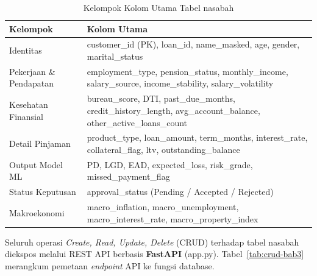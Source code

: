 \begin{table}[H]
\centering
\caption{Kelompok Kolom Utama Tabel nasabah}
\label{tab:db-cols}
\begin{tabularx}{\textwidth}{|p{3.5cm}|X|}
\hline
\textbf{Kelompok} & \textbf{Kolom Utama} \\ \hline
Identitas & customer\_id (PK), loan\_id, name\_masked, age, gender, marital\_status \\ \hline
Pekerjaan \& Pendapatan & employment\_type, pension\_status, monthly\_income, salary\_source, income\_stability, salary\_volatility \\ \hline
Kesehatan Finansial & bureau\_score, DTI, past\_due\_months, credit\_history\_length, avg\_account\_balance, other\_active\_loans\_count \\ \hline
Detail Pinjaman & product\_type, loan\_amount, term\_months, interest\_rate, collateral\_flag, ltv, outstanding\_balance \\ \hline
Output Model ML & PD, LGD, EAD, expected\_loss, risk\_grade, missed\_payment\_flag \\ \hline
Status Keputusan & approval\_status (Pending / Accepted / Rejected) \\ \hline
Makroekonomi & macro\_inflation, macro\_unemployment, macro\_interest\_rate, macro\_property\_index \\ \hline
\end{tabularx}
\end{table}

Seluruh operasi \textit{Create, Read, Update, Delete} (CRUD) terhadap tabel nasabah diekspos melalui REST API berbasis \textbf{FastAPI} (app.py). Tabel~\ref{tab:crud-bab3} merangkum pemetaan \textit{endpoint} API ke fungsi database.

